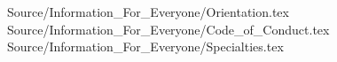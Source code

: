 
\component Source/Information_For_Everyone/Orientation.tex
\component Source/Information_For_Everyone/Code_of_Conduct.tex
\component Source/Information_For_Everyone/Specialties.tex



